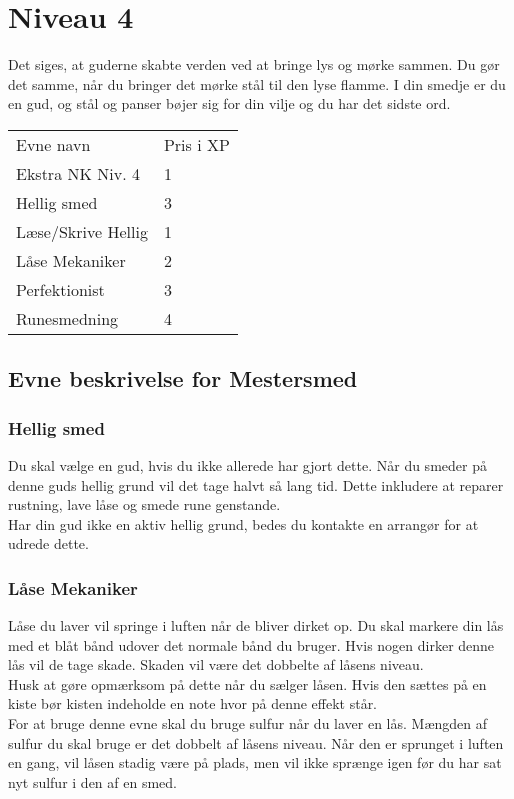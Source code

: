\chapter{Niveau 4}
Det siges, at guderne skabte verden ved at bringe lys og mørke sammen. Du gør det samme, når du bringer det mørke stål til den lyse flamme. I din smedje er du en gud, og stål og panser bøjer sig for din vilje og du har det sidste ord.\\


\begin{tabular}{|p{}|p{}|}
\hline
\rowcolor{cerulean!80}
 \multicolumn{2}{|c|}{ Mestersmed } \\
\hline
\rowcolor{cerulean!40}
    Evne navn & Pris i XP\\ \hline
    Ekstra NK Niv. 4 & 1\\\hline
    Hellig smed & 3 \\\hline
    Læse/Skrive Hellig  & 1\\\hline
    Låse Mekaniker & 2 \\\hline
    Perfektionist & 3 \\\hline
    Runesmedning   & 4\\\hline
\end{tabular}

\section{Evne beskrivelse for Mestersmed}



\subsection{Hellig smed}
Du skal vælge en gud, hvis du ikke allerede har gjort dette. Når du smeder på denne guds hellig grund vil det tage halvt så lang tid. Dette inkludere at reparer rustning, lave låse og smede rune genstande.\\
Har din gud ikke en aktiv hellig grund, bedes du kontakte en arrangør for at udrede dette.



\subsection{Låse Mekaniker}
Låse du laver vil springe i luften når de bliver dirket op. Du skal markere din lås med et blåt bånd udover det normale bånd du bruger. Hvis nogen dirker denne lås vil de tage skade. Skaden vil være det dobbelte af låsens niveau.\\
Husk at gøre opmærksom på dette når du sælger låsen. Hvis den sættes på en kiste bør kisten indeholde en note hvor på denne effekt står.\\
For at bruge denne evne skal du bruge sulfur når du laver en lås. Mængden af sulfur du skal bruge er det dobbelt af låsens niveau. Når den er sprunget i luften en gang, vil låsen stadig være på plads, men vil ikke sprænge igen før du har sat nyt sulfur i den af en smed.


